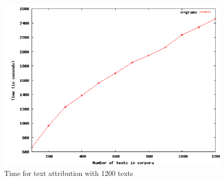 \begin{figure}[!hbp]
\includegraphics[width=\textwidth]{tabeller/work.png}
\caption{Time for text attribution with 1200 texts \label{fig:work}}
\end{figure}
